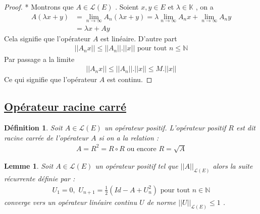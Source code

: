\documentclass{report}
\newtheorem{Def}{Définition}[subsection]
\newtheorem{Lem}{Lemme}[subsection]
\begin{document}
{\begin{proof}
* Montrons que $A \in \mathscr{L}(E)$ . Soient $x,y \in E$ et $\lambda \in \mathbb{K}$ , on a 
					\begin{align*}
					 A(\lambda x + y) &= \lim_{n\to \infty} A_n(\lambda x + y) = \lambda \lim_{n\to \infty} A_n x + \lim_{n\to \infty} A_n y \\
					 &= \lambda x + A y 
					\end{align*}
Cela signifie que l'opérateur $A$ est linéaire. D'autre part 
					\begin{align*}
					 ||A_n x|| \le ||A_n||.||x||  \,\,\text{pour tout}\,\, n \le \mathbb{N} 
					\end{align*}
Par passage a la limite 
					\begin{align*}
					 ||A_nx|| \le ||A_n||.||x|| \le M.||x|| 
					\end{align*}
Ce qui signifie que l'opérateur $A$ est continu.
\end{proof}


\subsection{\underline{Opérateur racine carré}}

\begin{Def} Soit $A \in \mathscr{L}(E)$ un opérateur  positif. L'opérateur positif $R$ est dit racine carrée de l'opérateur $A$ si on a la relation : 
					\begin{align*}
					 A = R^2 = R\circ R \,\, \text{ou encore}\,\,   R = \sqrt{A}  
					\end{align*}
\end{Def}

\begin{Lem} Soit $A \in \mathscr{L}(E)$ un opérateur positif tel que $||A||_{\mathscr{L}(E)}$ alors la suite récurrente définie par : 
					\begin{align*}
					 U_1 = 0 , \,\,   U_{n+1} = \frac{1}{2}(Id - A + U_n^2)  \,\,\text{pour tout}\,\, n \in \mathbb{N} 
					\end{align*}
converge vers un opérateur linéaire continu $U$ de norme $||U||_{\mathscr{L}(E)} \le 1$ .\\
\end{Lem}





}
\end{document}
